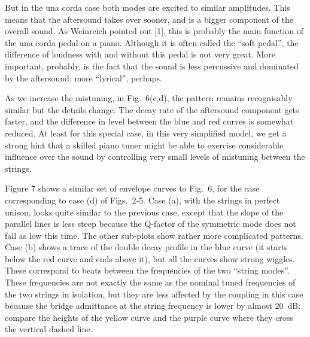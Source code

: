   But in the una corda case both modes are excited to similar amplitudes. This 
  means that the aftersound takes over sooner, and is a bigger component of the 
  overall sound. As Weinreich pointed out [1], this is probably the main 
  function of the una corda pedal on a piano. Although it is often called the 
  ``soft pedal'', the difference of loudness with and without this pedal is not 
  very great. More important, probably, is the fact that the sound is less 
  percussive and dominated by the aftersound: more ``lyrical'', perhaps. 

  As we increase the mistuning, in Fig.\ 6(c,d), the pattern remains 
  recognisably similar but the details change. The decay rate of the aftersound 
  component gets faster, and the difference in level between the blue and red 
  curves is somewhat reduced. At least for this special case, in this very 
  simplified model, we get a strong hint that a skilled piano tuner might be 
  able to exercise considerable influence over the sound by controlling very 
  small levels of mistuning between the strings. 

  Figure 7 shows a similar set of envelope curves to Fig.\ 6, for the case 
  corresponding to case (d) of Figs.\ 2-5. Case (a), with the strings in 
  perfect unison, looks quite similar to the previous case, except that the 
  slope of the parallel lines is less steep because the Q-factor of the 
  symmetric mode does not fall as low this time. The other sub-plots show 
  rather more complicated patterns. Case (b) shows a trace of the double decay 
  profile in the blue curve (it starts below the red curve and ends above it), 
  but all the curves show strong wiggles. These correspond to beats between the 
  frequencies of the two ``string modes''. These frequencies are not exactly 
  the same as the nominal tuned frequencies of the two strings in isolation, 
  but they are less affected by the coupling in this case because the bridge 
  admittance at the string frequency is lower by almost 20~dB: compare the 
  heights of the yellow curve and the purple curve where they cross the 
  vertical dashed line. 

